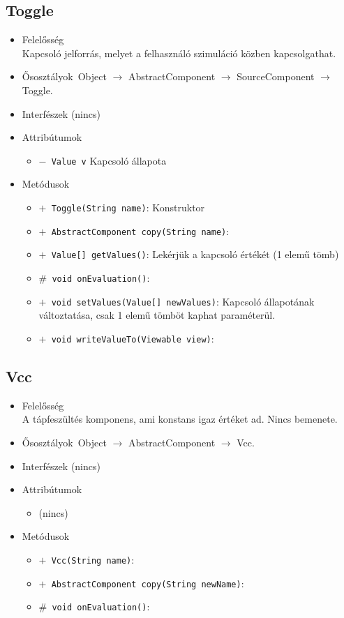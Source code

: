 \subsection{Toggle}
\begin{itemize}
\item Felelősség\\
Kapcsoló jelforrás, melyet a felhasználó szimuláció közben kapcsolgathat.
\item Ősosztályok\ Object $\rightarrow{}$ AbstractComponent $\rightarrow{}$ SourceComponent $\rightarrow{}$ Toggle.
\item Interfészek (nincs)
\item Attribútumok $\ $
\begin{itemize}
	\item[] \texttt{$-$ Value v} Kapcsoló állapota
\end{itemize}
\item Metódusok$\ $
\begin{itemize}
	\item[] \texttt{$+$ Toggle(String name)}: Konstruktor
	\item[] \texttt{$+$ AbstractComponent copy(String name)}: 
	\item[] \texttt{$+$ Value[] getValues()}: Lekérjük a kapcsoló értékét (1 elemű tömb)
	\item[] \texttt{$\#$ void onEvaluation()}: 
	\item[] \texttt{$+$ void setValues(Value[] newValues)}: Kapcsoló állapotának változtatása, csak 1 elemű tömböt kaphat paraméterül.
	\item[] \texttt{$+$ void writeValueTo(Viewable view)}: 
\end{itemize}
\end{itemize}

\subsection{Vcc}
\begin{itemize}
\item Felelősség\\
A tápfeszültés komponens, ami konstans igaz értéket ad. Nincs bemenete.
\item Ősosztályok\ Object $\rightarrow{}$ AbstractComponent $\rightarrow{}$ Vcc.
\item Interfészek (nincs)
\item Attribútumok $\ $
\begin{itemize}
\item (nincs)
\end{itemize}
\item Metódusok$\ $
\begin{itemize}
	\item[] \texttt{$+$ Vcc(String name)}: 
	\item[] \texttt{$+$ AbstractComponent copy(String newName)}: 
	\item[] \texttt{$\#$ void onEvaluation()}: 
\end{itemize}
\end{itemize}


